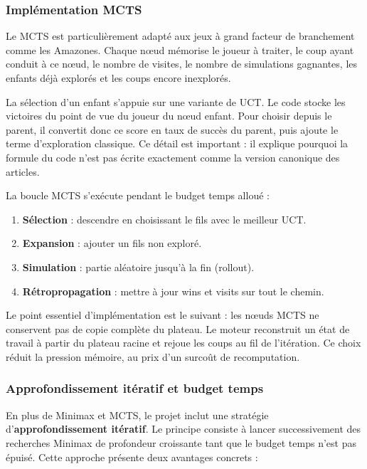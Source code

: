\documentclass[a4paper]{article}
\begin{document}
\subsubsection{Implémentation MCTS}

Le MCTS \cite{browne2012mcts} est particulièrement adapté aux jeux à grand facteur de branchement comme les Amazones. Chaque nœud mémorise le joueur à traiter, le coup ayant conduit à ce nœud, le nombre de visites, le nombre de simulations gagnantes, les enfants déjà explorés et les coups encore inexplorés.

La sélection d'un enfant s'appuie sur une variante de UCT. Le code stocke les victoires du point de vue du joueur du nœud enfant. Pour choisir depuis le parent, il convertit donc ce score en taux de succès du parent, puis ajoute le terme d'exploration classique. Ce détail est important : il explique pourquoi la formule du code n'est pas écrite exactement comme la version canonique des articles.

La boucle MCTS s'exécute pendant le budget temps alloué :

\begin{enumerate}
    \item \textbf{Sélection} : descendre en choisissant le fils avec le meilleur UCT.
    \item \textbf{Expansion} : ajouter un fils non exploré.
    \item \textbf{Simulation} : partie aléatoire jusqu'à la fin (rollout).
    \item \textbf{Rétropropagation} : mettre à jour wins et visits sur tout le chemin.
\end{enumerate}

Le point essentiel d'implémentation est le suivant : les nœuds MCTS ne conservent pas de copie complète du plateau. Le moteur reconstruit un état de travail à partir du plateau racine et rejoue les coups au fil de l'itération. Ce choix réduit la pression mémoire, au prix d'un surcoût de recomputation.

\subsubsection{Approfondissement itératif et budget temps}

En plus de Minimax et MCTS, le projet inclut une stratégie d'\textbf{approfondissement itératif}. Le principe consiste à lancer successivement des recherches Minimax de profondeur croissante tant que le budget temps n'est pas épuisé. Cette approche présente deux avantages concrets :
\end{document}

